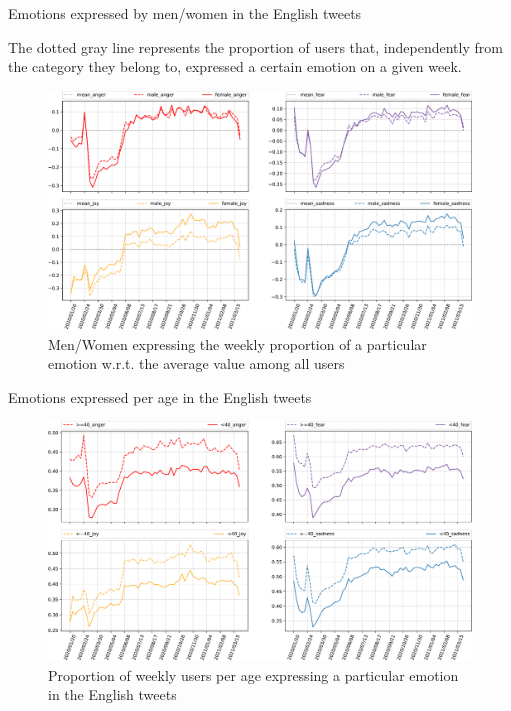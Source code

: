 \documentclass[8pt]{beamer}  %
\begin{document}
\begin{frame}{Emotions expressed by men/women in the English tweets}

    The dotted gray line represents the proportion of users that, independently from the category they belong to, expressed a certain emotion on a given week.

    \begin{figure}[H]
	    \centering
    	\includegraphics[scale=.22]{assets/img/en_4_emotions_per_category_over_mean_subplot_1.svg.pdf}
    	\caption{Men/Women expressing the weekly proportion of a particular emotion w.r.t. the average value among all users}
    	\label{fig:en-4-emotions-per-category-course-mean-1}
    \end{figure}
    
\end{frame}

\begin{frame}{Emotions expressed per age in the English tweets}

    \begin{figure}[H]
	    \centering
    	\includegraphics[scale=.25]{assets/img/en_4_emotions_per_age_subplot_1.svg.pdf}
    	\caption{Proportion of weekly users per age expressing a particular emotion in the English tweets}
    	\label{fig:en-4-emotions-per-age-subplot-1}
    \end{figure}
    
\end{frame}
\end{document}
